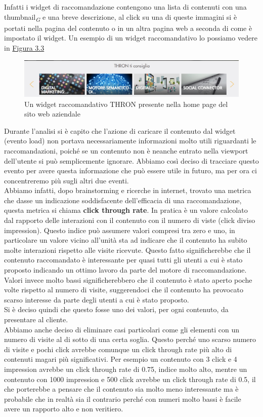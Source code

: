 \documentclass[a4paper, 12pt, twoside, openright]{book}
\newcommand{\gloss}[1]{#1\textsubscript{\textit{\tiny{G}}}}
\begin{document}
Infatti i widget di raccomandazione contengono una lista di contenuti con una \gloss{thumbnail} e una breve descrizione, al click su una di queste immagini si è portati nella pagina del contenuto o in un altra pagina web a seconda di come è impostato il widget. Un esempio di un widget raccomandativo lo possiamo vedere in \hyperref[pcr-example]{Figura 3.3}
\begin{figure}[H]
	\centering
	\label{pcr-example}
	\includegraphics[width=1.0\textwidth]{images/pcr-example.jpg}
	\caption{Un widget raccomandativo THRON presente nella home page del sito web aziendale}
\end{figure} 

Durante l'analisi si è capito che l'azione di caricare il contenuto dal widget (evento load) non portava necessariamente informazioni molto utili riguardanti le raccomandazioni, poiché se un contenuto non è neanche entrato nella viewport dell'utente si può semplicemente ignorare. Abbiamo così deciso di tracciare questo evento per avere questa informazione che può essere utile in futuro, ma per ora ci concentreremo più sugli altri due eventi.\\

Abbiamo infatti, dopo brainstorming e ricerche in internet, trovato una metrica che dasse un indicazione soddisfacente dell'efficacia di una raccomandazione, questa metrica si chiama \textbf{click through rate}. In pratica è un valore calcolato dal rapporto delle interazioni con il contenuto con il numero di viste (click diviso impression). Questo indice può assumere valori compresi tra zero e uno, in particolare un valore vicino all'unità sta ad indicare che il contenuto ha subito molte interazioni rispetto alle visite ricevute. Questo fatto significherebbe che il contenuto raccomandato è interessante per quasi tutti gli utenti a cui è stato proposto indicando un ottimo lavoro da parte del motore di raccomandazione. Valori invece molto bassi significherebbero che il contenuto è stato aperto poche volte rispetto al numero di visite, suggerendoci che il contenuto ha provocato scarso interesse da parte degli utenti a cui è stato proposto.\\
Si è deciso quindi che questo fosse uno dei valori, per ogni contenuto, da presentare al cliente.\\
Abbiamo anche deciso di eliminare casi particolari come gli elementi con un numero di visite al di sotto di una certa soglia. Questo perché uno scarso numero di visite e pochi click avrebbe comunque un click through rate più alto di contenuti magari più significativi. Per esempio un contenuto con 3 click e 4 impression avrebbe un click through rate di 0.75, indice molto alto, mentre un contenuto con 1000 impression e 500 click avrebbe un click through rate di 0.5, il che porterebbe a pensare che il contenuto sia molto meno interessante ma è probabile che in realtà sia il contrario perché con numeri molto bassi è facile avere un rapporto alto e non veritiero.\\
\end{document}
